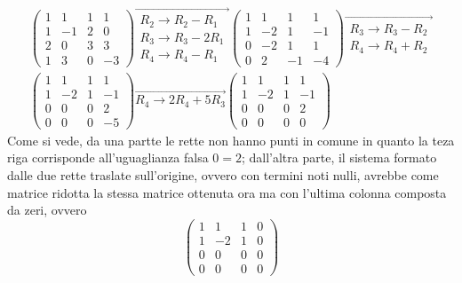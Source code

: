 \begin{equation}
  \label{eq:qualcheappgeo7}
\begin{matrix}
  \left(
    \begin{array}{ccc|c}
      1 & 1 & 1 & 1\\
      1 & -1 & 2 & 0\\
      2 & 0 & 3 & 3\\
      1 & 3 & 0 & -3
    \end{array}\right)
  \overrightarrow{
     \begin{matrix}
       R_2\to R_2-R_1\\
       R_3\to R_3-2R_1\\
       R_4\to R_4-R_1
     \end{matrix}
   }
 \left(
   \begin{array}{ccc|c}
     1 & 1 & 1 & 1 \\
     1  & -2 & 1 & -1 \\
     0  & -2 & 1 & 1 \\
     0 & 2 & -1 & -4
   \end{array}
 \right) \overrightarrow{
   \begin{matrix}
     R_3\to R_3-R_2\\
     R_4\to R_4+R_2
   \end{matrix}
}\\
\left(
  \begin{array}{ccc|c}
    1 & 1 & 1 & 1 \\
    1 & -2 & 1 & -1 \\
    0 & 0 & 0 & 2 \\
    0 & 0 & 0 & -5
  \end{array}
  \right)\overrightarrow{R_4\to 2R_4+5R_3}\left(
  \begin{array}{ccc|c}
    1 & 1 & 1 & 1 \\
    1 & -2 & 1 & -1\\
    0 & 0 & 0 & 2\\
    0 & 0 & 0 & 0
  \end{array}\right)
  \end{matrix}
\end{equation}
Come si vede, da una partte le rette non hanno punti in comune in quanto la teza riga corrisponde
all'uguaglianza falsa $0 = 2$; dall'altra parte, il sistema formato dalle due rette traslate
sull'origine, ovvero con termini noti nulli, avrebbe come matrice ridotta la stessa matrice ottenuta
ora ma con l'ultima colonna composta da zeri, ovvero
\begin{equation*}
  \left(
    \begin{array}{ccc|c}
      1 & 1 & 1 & 0 \\
      1 & -2 & 1 & 0\\
      0 & 0 & 0 & 0\\
      0 & 0 & 0 & 0
    \end{array}
  \right)
\end{equation*}

